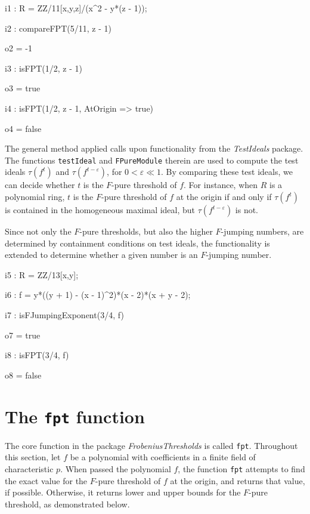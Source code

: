 \documentclass{amsart}
\begin{document}
\smallskip
{\small
{}
\begin{MyVerbatim}
i1 : R = ZZ/11[x,y,z]/(x^2 - y*(z - 1));

i2 : compareFPT(5/11, z - 1)

o2 = -1

i3 : isFPT(1/2, z - 1)

o3 = true

i4 : isFPT(1/2, z - 1, AtOrigin => true)

o4 = false
\end{MyVerbatim}
}
\smallskip

The general method applied calls upon functionality from the \emph{TestIdeals} package.
The functions \texttt{testIdeal} and \texttt{FPureModule} therein are used to compute the test ideals $\tau(f^t)$ and $\tau(f^{t-\varepsilon})$, for $0<\varepsilon\ll 1$.
By comparing these test ideals, we can decide whether $t$ is the $F$-pure threshold of $f$.
For instance, when $R$ is a polynomial ring, $t$ is the $F$-pure threshold of $f$ at the origin if and only if $\tau(f^t)$ is contained in the homogeneous maximal ideal, but $\tau(f^{t-\varepsilon})$ is not.

Since not only the $F$-pure thresholds, but also the higher $F$-jumping numbers, are determined by containment conditions on test ideals, the functionality is extended to determine whether a given number is an $F$-jumping number.

\smallskip
{\small
{}
\begin{MyVerbatim}
i5 : R = ZZ/13[x,y];

i6 : f = y*((y + 1) - (x - 1)^2)*(x - 2)*(x + y - 2);

i7 : isFJumpingExponent(3/4, f)

o7 = true

i8 : isFPT(3/4, f)

o8 = false
\end{MyVerbatim}
}


\section{The {\tt fpt} function}
\label{sec.FPT}

The core function in the package \emph{FrobeniusThresholds} is called \texttt{fpt}.  Throughout this section, let $f$ be a polynomial with coefficients in a finite field of characteristic $p$. When passed the polynomial $f$, the function \texttt{fpt} attempts to find the exact value for the $F$-pure threshold of $f$ at the origin, and returns that value, if possible.  Otherwise, it returns lower and upper bounds for the $F$-pure threshold, as demonstrated below.
\end{document}
